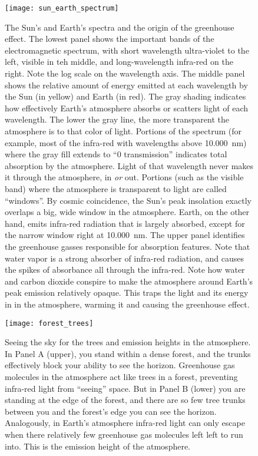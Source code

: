 \begin{figure}[p]
\centering
\texttt{[image: sun\_earth\_spectrum]}%
\caption{The Sun's and Earth's spectra and the origin of the greenhouse effect. The lowest panel shows the important bands of the electromagnetic spectrum, with short wavelength ultra-violet to the left, visible in teh middle, and long-wavelength infra-red on the right. Note the log scale on the wavelength axis. The middle panel shows the relative amount of energy emitted at each wavelength by the Sun (in yellow) and Earth (in red). The gray shading indicates how effectively Earth's atmosphere absorbs or scatters light of each wavelength. The lower the gray line, the more transparent the atmosphere is to that color of light. Portions of the spectrum (for example, most of the infra-red with wavelengths above \SI{10,000}{\nano\metre}) where the gray fill extends to ``0 transmission'' indicates total absorption by the atmosphere. Light of that wavelength never makes it through the atmosphere, in \textit{or} out. Portions (such as the visible band) where the atmosphere is transparent to light are called ``windows''. By cosmic coincidence, the Sun's peak insolation exactly overlaps a big, wide window in the atmosphere. Earth, on the other hand, emits infra-red radiation that is largely absorbed, except for the narrow window right at \SI{10,000}{\nano\metre}. The upper panel identifies the greenhouse gasses responsible for absorption features. Note that water vapor is a strong absorber of infra-red radiation, and causes the spikes of absorbance all through the infra-red. Note how water and carbon dioxide conspire to make the atmosphere around Earth's peak emission relatively opaque. This traps the light and its energy in in the atmosphere, warming it and causing the greenhouse effect.}   
\label{fig:sun_earth_spectrum}
\end{figure}

\begin{figure}[p]
\centering
\texttt{[image: forest\_trees]}%
\caption{Seeing the sky for the trees and emission heights in the atmosphere. In Panel A (upper), you stand within a dense forest, and the trunks effectively block your ability to see the horizon. Greenhouse gas molecules in the atmosphere act like trees in a forest, preventing infra-red light from ``seeing'' space. But in Panel B (lower) you are standing at the edge of the forest, and there are so few tree trunks between you and the forest's edge you can see the horizon. Analogously, in Earth's atmosphere infra-red light can only escape when there relatively few greenhouse gas molecules left left to run into. This is the emission height of the atmosphere.}   
\label{fig:forest_trees}
\end{figure}

